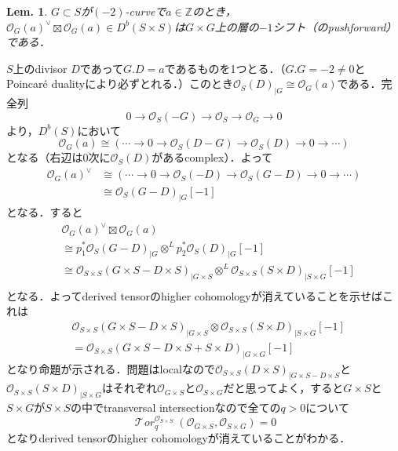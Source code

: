 \documentclass[uplatex,a4paper,11pt,dvipdfmx]{jsarticle}
\makeatletter
\theoremstyle{mystyle} %
\newtheorem{lemma}[theorem]{Lem.}
\renewenvironment{proof}[1][\proofname]{\par
 \pushQED{\qed}%
 \normalfont \topsep6\p@\@plus6\p@\relax
 \trivlist
 \item[\hskip\labelsep
 \itshape
 {\bf\underline{#1}}]\ignorespaces
}{%
 \popQED\endtrivlist\@endpefalse
}
\newcommand{\Torsheaf}{\mathop{\mathcal{T}\! \mathit{or}}\nolimits}
\makeatother
\begin{document}
\begin{lemma}\label{boxtimes_is_a_sheaf}
	$G \subset S$が$(-2)$-curveで$a \in \mathbb{Z}$のとき，$\mathcal{O}_G(a)^\vee \boxtimes \mathcal{O}_G(a) \in D^b(S\times S)$は$G\times G$上の層の$-1$シフト（のpushforward）である．
\end{lemma}
\begin{proof}
	$S$上のdivisor $D$であって$G.D = a$であるものを1つとる．（$G.G = -2 \neq 0$とPoincaré dualityにより必ずとれる．）このとき$\mathcal{O}_S(D)_{|G} \cong \mathcal{O}_G(a)$である．完全列$$0 \to \mathcal{O}_S(-G) \to \mathcal{O}_S \to \mathcal{O}_G \to 0$$より，$D^b(S)$において$$\mathcal{O}_G(a) \cong (\cdots \to 0 \to \mathcal{O}_S(D-G) \to \mathcal{O}_S(D) \to 0 \to \cdots)$$となる（右辺は$0$次に$\mathcal{O}_S(D)$があるcomplex）．よって
	\begin{align*}
		\mathcal{O}_G(a)^\vee & \cong (\cdots \to 0 \to \mathcal{O}_S(-D) \to \mathcal{O}_S(G-D) \to 0 \to \cdots) \\
		                      & \cong \mathcal{O}_S(G-D)_{|G}[-1]
	\end{align*}
	となる．すると
	\begin{align*}
		 & \mathcal{O}_G(a)^\vee \boxtimes \mathcal{O}_G(a)                                                                                 \\
		 & \cong p_1^*\mathcal{O}_S(G-D)_{|G} \otimes^L p_2^*\mathcal{O}_S(D)_{|G}[-1]                                                      \\
		 & \cong \mathcal{O}_{S\times S}(G\times S - D\times S)_{|G\times S} \otimes^L \mathcal{O}_{S\times S}(S \times D)_{|S\times G}[-1] \\
	\end{align*}
	となる．よってderived tensorのhigher cohomologyが消えていることを示せばこれは
	\begin{align*}
		 & \mathcal{O}_{S\times S}(G\times S - D\times S)_{|G\times S} \otimes \mathcal{O}_{S\times S}(S \times D)_{|S\times G}[-1] \\
		 & = \mathcal{O}_{S\times S}(G\times S - D\times S+S \times D)_{|G\times G}[-1]
	\end{align*}
	となり命題が示される．問題はlocalなので$\mathcal{O}_{S\times S}(D\times S)_{|G\times S - D\times S}$と$\mathcal{O}_{S\times S}(S \times D)_{|S\times G}$はそれぞれ$\mathcal{O}_{G\times S}$と$\mathcal{O}_{S\times G}$だと思ってよく，すると$G \times S$と$S \times G$が$S \times S$の中でtransversal intersectionなので全ての$q>0$について$$\Torsheaf_q^{\mathcal{O}_{S\times S}}(\mathcal{O}_{G\times S}, \mathcal{O}_{S\times G})=0$$となりderived tensorのhigher cohomologyが消えていることがわかる．
\end{proof}
\end{document}
